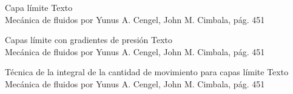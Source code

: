 
\begin{frame}{Capa límite}
\justifying
Texto
\\
{\tiny Mecánica de fluidos por Yunus A. Cengel, John M. Cimbala, pág. 451}
\end{frame}


\begin{frame}{Capas límite con gradientes de presión}
\justifying
Texto
\\
{\tiny Mecánica de fluidos por Yunus A. Cengel, John M. Cimbala, pág. 451}
\end{frame}


\begin{frame}{Técnica de la integral de la cantidad de movimiento para capas límite}
\justifying
Texto
\\
{\tiny Mecánica de fluidos por Yunus A. Cengel, John M. Cimbala, pág. 451}
\end{frame}